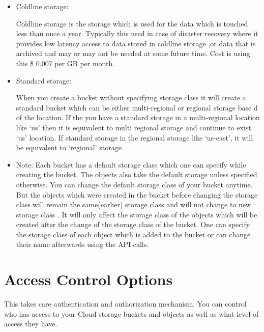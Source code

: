 \documentclass[9pt,twocolumn,twoside]{styles/osajnl}
\begin{document}
\begin{itemize}
\item Coldline storage:


Coldline storage is the storage which is used for the data which is touched less than once a year. Typically this used in case of disaster recovery where it provides low latency access to data stored in coldline storage ,or data that is archived and may or may not be needed at some future time. Cost is using this \$  0.007 per GB per month.


\item Standard storage: 

When you create a bucket without specifying storage class it will create a standard bucket which can be either multi-regional or regional storage base d of the location. If the you have a standard storage in a multi-regional location like ‘us’ then it is equivalent to multi regional storage and continue to exist ‘us’ location. If standard storage in the regional storage like ‘us-east’, it will be equivalent to ‘regional’ storage 


\item Note:
Each bucket has a default storage class which one can specify while creating the bucket. The objects also take the default storage unless specified otherwise. You can change the default storage class of your bucket anytime. But the objects which were created in the bucket before changing the storage class will remain the same(earlier) storage class and will not change to new storage class . It will only affect the storage class of the objects which will be created after the change of the storage class of the bucket.
One can specify the storage class of each object which is added to the bucket or can change their name afterwards using the API calls. 

\end{itemize}



\section{Access Control Options}

This takes care authentication and authorization mechanism. You can control who has access to your Cloud storage buckets and objects as well as what level of access they have. 
\end{document}
